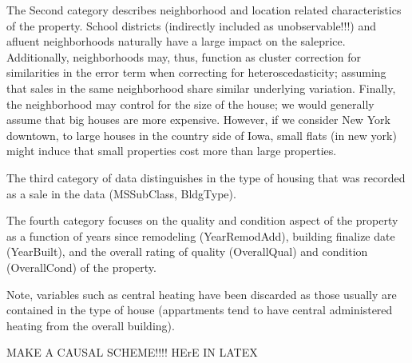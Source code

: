 \documentclass{article}
\begin{document}
The Second category describes neighborhood and location related characteristics of the property. School districts (indirectly included as unobservable!!!) and afluent neighborhoods naturally have a large impact on the saleprice. Additionally, neighborhoods may, thus, function as cluster correction for similarities in the error term when correcting for heteroscedasticity; assuming that sales in the same neighborhood share similar underlying variation. Finally, the neighborhood may control for the size of the house; we would generally assume that big houses are more expensive. However, if we consider New York downtown, to large houses in the country side of Iowa, small flats (in new york) might induce that small properties cost more than large properties. 

The third category of data distinguishes in the type of housing that was recorded as a sale in the data (MSSubClass, BldgType). 

The fourth category focuses on the quality and condition aspect of the property as a function of years since remodeling (YearRemodAdd), building finalize date (YearBuilt), and the overall rating of quality (OverallQual) and condition (OverallCond) of the property.


Note, variables such as central heating have been discarded as those usually are contained in the type of house (appartments tend to have central administered heating from the overall building).

MAKE A CAUSAL SCHEME!!!! HErE IN LATEX
\end{document}
